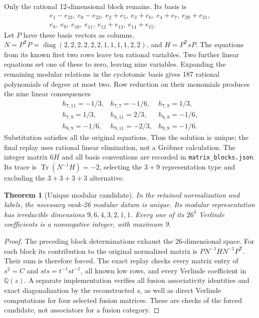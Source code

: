 \documentclass[11pt]{article}
\newtheorem{theorem}{Theorem}[section]
\begin{document}
Only the rational 12-dimensional block remains. Its basis is
\[
\begin{gathered}
e_1-e_{23},\ e_0-e_{22},\ e_2+e_5,\ e_3+e_6,\ e_4+e_7,
\ e_{20}+e_{21},\\
e_8,\ e_9,\ e_{10},\ e_{11},\ e_{12}+e_{13},\ e_{14}+e_{15}.
\end{gathered}
\]
Let $P$ have these basis vectors as columns,
$N=P^{\mathsf T}P=\operatorname{diag}(2,2,2,2,2,2,1,1,1,1,2,2)$,
and $H=P^{\mathsf T}sP$. The equations from its known first two rows
leave ten rational variables. Two further linear equations set one of
these to zero, leaving nine variables. Expanding
the remaining modular relations in the cyclotomic basis gives 187
rational polynomials of degree at most two. Row reduction on their
monomials produces the nine linear consequences
\[
\begin{array}{lll}
h_{7,11}=-1/3,&h_{7,7}=-1/6,&h_{7,8}=1/3,\\
h_{7,9}=1/3,&h_{8,11}=2/3,&h_{8,8}=-1/6,\\
h_{8,9}=-1/6,&h_{9,11}=-2/3,&h_{9,9}=-1/6.
\end{array}
\]
Substitution satisfies all the original equations. Thus the solution
is unique; the final replay uses rational linear elimination, not a
Gr\"obner calculation. The integer matrix $6H$ and all basis conventions
are recorded in \texttt{matrix\_blocks.json}. Its trace is
$\operatorname{Tr}(N^{-1}H)=-2$, selecting the $3+9$ representation
type and excluding the $3+3+3+3$ alternative.

\begin{theorem}[Unique modular candidate]
In the retained normalization and labels, the necessary rank-26
modular datum is unique. Its modular representation has irreducible
dimensions $9,6,4,3,2,1,1$. Every one of its $26^3$ Verlinde
coefficients is a nonnegative integer, with maximum 9.
\end{theorem}
\begin{proof}
The preceding block determinations exhaust the 26-dimensional space.
For each block its contribution to the original normalized matrix is
$PN^{-1}HN^{-1}P^{\mathsf T}$. Their sum is therefore forced.
The exact replay checks every matrix entry of $s^2=C$ and
$sts=t^{-1}st^{-1}$, all known low rows, and every Verlinde coefficient
in $\mathbb Q(z)$. A separate implementation verifies all fusion
associativity identities and exact diagonalization by the reconstructed
$s$, as well as direct Verlinde computations for four selected fusion
matrices. These are checks of the forced candidate, not associators
for a fusion category.
\end{proof}
\end{document}
